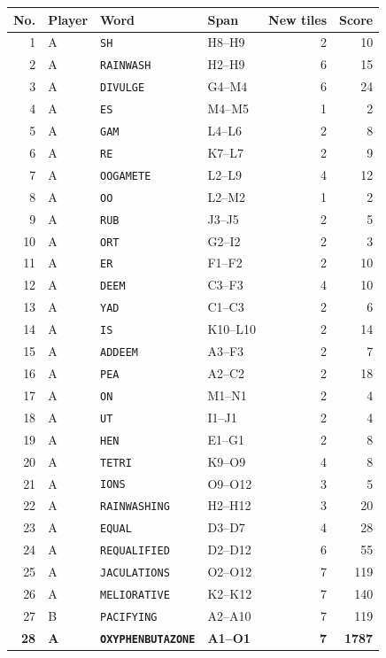 \documentclass[letterpaper]{article}
\begin{document}
\begin{center}
\fontsize{8}{8.15}\selectfont
\setlength{\tabcolsep}{4pt}
\renewcommand{\arraystretch}{0.80}
\begin{tabular}{@{}rlllrr@{}}\toprule
No. & Player & Word & Span & New tiles & Score\\
\midrule
1 & A & \texttt{SH} & H8--H9 & 2 & 10\\
2 & A & \texttt{RAINWASH} & H2--H9 & 6 & 15\\
3 & A & \texttt{DIVULGE} & G4--M4 & 6 & 24\\
4 & A & \texttt{ES} & M4--M5 & 1 & 2\\
5 & A & \texttt{GAM} & L4--L6 & 2 & 8\\
6 & A & \texttt{RE} & K7--L7 & 2 & 9\\
7 & A & \texttt{OOGAMETE} & L2--L9 & 4 & 12\\
8 & A & \texttt{OO} & L2--M2 & 1 & 2\\
9 & A & \texttt{RUB} & J3--J5 & 2 & 5\\
10 & A & \texttt{ORT} & G2--I2 & 2 & 3\\
11 & A & \texttt{ER} & F1--F2 & 2 & 10\\
12 & A & \texttt{DEEM} & C3--F3 & 4 & 10\\
13 & A & \texttt{YAD} & C1--C3 & 2 & 6\\
14 & A & \texttt{IS} & K10--L10 & 2 & 14\\
15 & A & \texttt{ADDEEM} & A3--F3 & 2 & 7\\
16 & A & \texttt{PEA} & A2--C2 & 2 & 18\\
17 & A & \texttt{ON} & M1--N1 & 2 & 4\\
18 & A & \texttt{UT} & I1--J1 & 2 & 4\\
19 & A & \texttt{HEN} & E1--G1 & 2 & 8\\
20 & A & \texttt{TETRI} & K9--O9 & 4 & 8\\
21 & A & \texttt{IONS} & O9--O12 & 3 & 5\\
22 & A & \texttt{RAINWASHING} & H2--H12 & 3 & 20\\
23 & A & \texttt{EQUAL} & D3--D7 & 4 & 28\\
24 & A & \texttt{REQUALIFIED} & D2--D12 & 6 & 55\\
25 & A & \texttt{JACULATIONS} & O2--O12 & 7 & 119\\
26 & A & \texttt{MELIORATIVE} & K2--K12 & 7 & 140\\
27 & B & \texttt{PACIFYING} & A2--A10 & 7 & 119\\
\midrule
\textbf{28} & \textbf{A} & \textbf{\texttt{OXYPHENBUTAZONE}} & \textbf{A1--O1} & \textbf{7} & \textbf{1787}\\
\bottomrule\end{tabular}
\end{center}
\vfill
\clearpage
\end{document}
